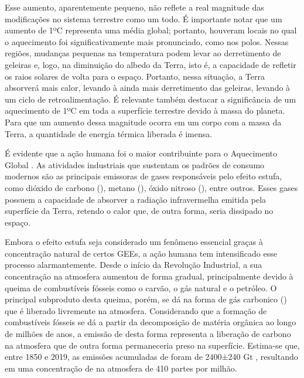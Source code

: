 Esse aumento, aparentemente pequeno, não reflete a real magnitude das modificações no sistema terrestre como um todo. É
importante notar que um aumento de 1ºC representa uma média global; portanto, houveram locais no qual o aquecimento foi
significativamente mais pronunciado, como nos polos. Nessas regiões, mudanças pequenas na temperatura podem levar ao
derretimento de geleiras e, logo, na diminuição do albedo da Terra, isto é, a capacidade de refletir os raios solares de
volta para o espaço. Portanto, nessa situação, a Terra absorverá mais calor, levando à ainda mais derretimento das
geleiras, levando à um ciclo de retroalimentação. É relevante também destacar a significância de um aquecimento de 1ºC
em toda a superfície terrestre devido à massa do planeta. Para que um aumento dessa magnitude ocorra em um corpo com a
massa da Terra, a quantidade de energia térmica liberada é imensa.

É evidente que a ação humana foi o maior contribuinte para o Aquecimento Global \cite{ipcc, gillett}. As atividades
industriais que sustentam os padrões de consumo modernos são as principais emissoras de gases responsáveis pelo efeito
estufa, como dióxido de carbono (), metano (), óxido nitroso (), entre outros. Esses gases
possuem a capacidade de absorver a radiação infravermelha emitida pela superfície da Terra, retendo o calor que, de
outra forma, seria dissipado no espaço. 

Embora o efeito estufa seja considerado um fenômeno essencial graças à concentração natural de certos GEEs, a ação
humana tem intensificado esse processo alarmantemente. Desde o início da Revolução Industrial, a sua concentração na
atmosfera aumentou de forma gradual, principalmente devido à queima de combustíveis fósseis como o carvão, o gás natural
e o petróleo. O principal subproduto desta queima, porém, se dá na forma de gás carbonico () que é liberado
livremente na atmosfera. Considerando que a formação de combustíveis fósseis se dá a partir da decomposição de matéria
orgânica ao longo de milhões de anos, a emissão de  desta forma representa a liberação de carbono na atmosfera
que de outra forma permaneceria preso na superfície. Estima-se que, entre 1850 e 2019, as emissões acumuladas de
 foram de 2400±240 Gt \cite{friedlingstein}, resultando em uma concentração de  na atmosfera de
410 partes por milhão.

